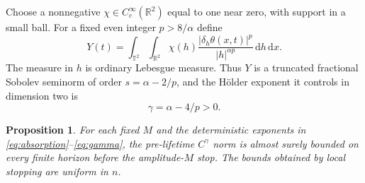 \documentclass[11pt]{amsart}
\newtheorem{proposition}[theorem]{Proposition}
\theoremstyle{remark}
\numberwithin{equation}{section}
\newcommand{\T}{\mathbb T}
\newcommand{\R}{\mathbb R}
\newcommand{\dd}{\,\mathrm d}
\begin{document}
Choose a nonnegative $\chi\in C_c^\infty(\R^2)$ equal to one near zero,
with support in a small ball. For a fixed even integer $p>8/\alpha$ define
\begin{equation}\label{eq:Y}
 Y(t)=\int_{\T^2}\int_{\R^2}
       \chi(h)\frac{|\delta_h\theta(x,t)|^p}{|h|^{\alpha p}}\dd h\dd x.
\end{equation}
The measure in $h$ is ordinary Lebesgue measure. Thus $Y$ is a truncated
fractional Sobolev seminorm of order $s=\alpha-2/p$, and the H\"older exponent
it controls in dimension two is
\begin{equation}\label{eq:gamma}
 \gamma=\alpha-4/p>0.
\end{equation}

\begin{proposition}\label{prop:holder}
For each fixed $M$ and the deterministic exponents in
\eqref{eq:absorption}--\eqref{eq:gamma}, the pre-lifetime $C^\gamma$ norm
is almost surely bounded on every finite horizon before the amplitude-$M$ stop.
The bounds obtained by local stopping are uniform in $n$.
\end{proposition}
\end{document}
